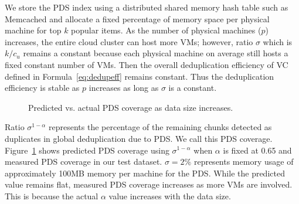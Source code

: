 {%

We store the PDS index using a distributed shared memory hash table such as Memcached
and allocate a fixed percentage of memory space per physical machine for top $k$ popular items.
As the number of physical machines ($p$) increases,
the entire cloud cluster can host more VMs; however,  ratio $\sigma$ which is $k/c_u$ remains
a constant because each physical machine on average still hosts a fixed constant number of 
VMs. Then the overall deduplication efficiency of VC defined in Formula~\ref{eq:dedupeff}
remains constant.
Thus the deduplication efficiency is stable  as $p$ increases as long as $\sigma$  is a constant.


\begin{figure}[htbp]
  \centering
  \caption{Predicted vs. actual PDS coverage as data size increases.}
  \label{fig:cds-coverage}
\end{figure}
Ratio $\sigma^{1-\alpha}$ represents the percentage of the remaining
chunks detected as duplicates in global deduplication due to PDS.
We call this PDS coverage.
Figure~\ref{fig:cds-coverage} shows predicted PDS coverage using $\sigma^{1-\alpha}$ when $\alpha$ is fixed at
0.65 and measured PDS coverage in our test dataset.
$\sigma=2\%$ represents memory usage of approximately 100MB memory per machine for the PDS.
While the predicted value remains flat, measured PDS coverage increases as more VMs are involved.
This is because the actual $\alpha$ value increases with the data size.
}
